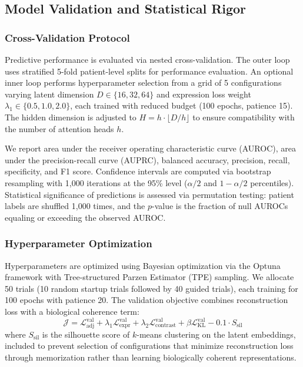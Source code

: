 \documentclass{article}
\begin{document}
\subsection{Model Validation and Statistical Rigor}

\subsubsection{Cross-Validation Protocol}

Predictive performance is evaluated via nested cross-validation. The outer loop uses stratified 5-fold patient-level splits for performance evaluation. An optional inner loop performs hyperparameter selection from a grid of 5 configurations varying latent dimension $D \in \{16, 32, 64\}$ and expression loss weight $\lambda_1 \in \{0.5, 1.0, 2.0\}$, each trained with reduced budget (100 epochs, patience 15). The hidden dimension is adjusted to $H = h \cdot \lfloor D / h \rfloor$ to ensure compatibility with the number of attention heads $h$.

We report area under the receiver operating characteristic curve (AUROC), area under the precision-recall curve (AUPRC), balanced accuracy, precision, recall, specificity, and F1 score. Confidence intervals are computed via bootstrap resampling with 1,000 iterations at the 95\% level ($\alpha/2$ and $1-\alpha/2$ percentiles). Statistical significance of predictions is assessed via permutation testing: patient labels are shuffled 1,000 times, and the $p$-value is the fraction of null AUROCs equaling or exceeding the observed AUROC.

\subsubsection{Hyperparameter Optimization}

Hyperparameters are optimized using Bayesian optimization via the Optuna framework \citep{akiba2019optuna} with Tree-structured Parzen Estimator (TPE) sampling. We allocate 50 trials (10 random startup trials followed by 40 guided trials), each training for 100 epochs with patience 20. The validation objective combines reconstruction loss with a biological coherence term:
\begin{equation}
\mathcal{J} = \mathcal{L}_{\text{adj}}^{\text{val}} + \lambda_1 \mathcal{L}_{\text{expr}}^{\text{val}} + \lambda_2 \mathcal{L}_{\text{contrast}}^{\text{val}} + \beta \mathcal{L}_{\text{KL}}^{\text{val}} - 0.1 \cdot S_{\text{sil}}
\end{equation}
where $S_{\text{sil}}$ is the silhouette score of $k$-means clustering on the latent embeddings, included to prevent selection of configurations that minimize reconstruction loss through memorization rather than learning biologically coherent representations.
\end{document}
